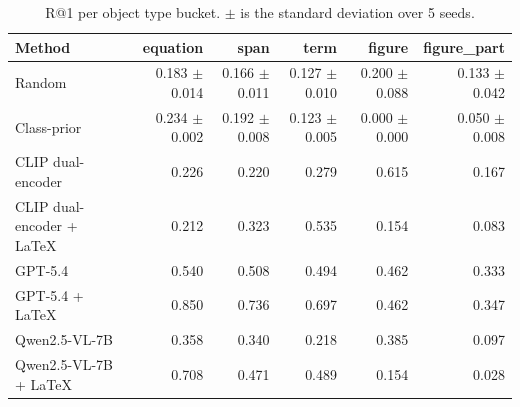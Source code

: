 \begin{table}[t]
\centering
\caption{R@1 per object type bucket. $\pm$ is the standard deviation over 5 seeds.}
\label{tab:bd_object_type_r1}
\begin{tabular}{lrrrrr}
\toprule
Method & equation & span & term & figure & figure\_part \\
\midrule
Random & 0.183 $\pm$ 0.014 & 0.166 $\pm$ 0.011 & 0.127 $\pm$ 0.010 & 0.200 $\pm$ 0.088 & 0.133 $\pm$ 0.042 \\
Class-prior & 0.234 $\pm$ 0.002 & 0.192 $\pm$ 0.008 & 0.123 $\pm$ 0.005 & 0.000 $\pm$ 0.000 & 0.050 $\pm$ 0.008 \\
CLIP dual-encoder & 0.226 & 0.220 & 0.279 & 0.615 & 0.167 \\
CLIP dual-encoder + LaTeX & 0.212 & 0.323 & 0.535 & 0.154 & 0.083 \\
GPT-5.4 & 0.540 & 0.508 & 0.494 & 0.462 & 0.333 \\
GPT-5.4 + LaTeX & 0.850 & 0.736 & 0.697 & 0.462 & 0.347 \\
Qwen2.5-VL-7B & 0.358 & 0.340 & 0.218 & 0.385 & 0.097 \\
Qwen2.5-VL-7B + LaTeX & 0.708 & 0.471 & 0.489 & 0.154 & 0.028 \\
\bottomrule
\end{tabular}
\end{table}
